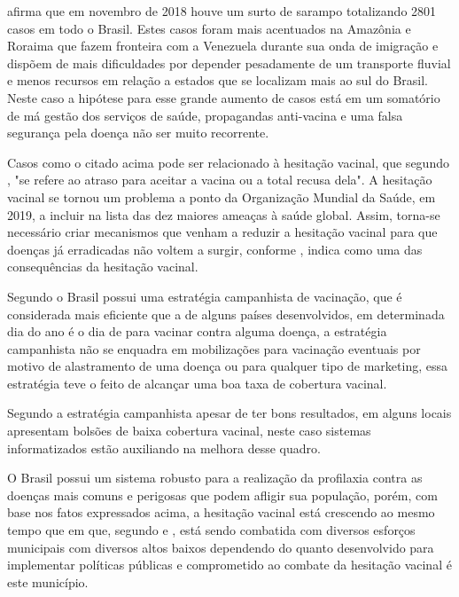 \cite{lima_os_2020} afirma que em novembro de 2018 houve um surto de sarampo totalizando 2801 casos em todo o Brasil. Estes casos foram mais acentuados na Amazônia e Roraima que fazem fronteira com a Venezuela durante sua onda de imigração e dispõem de mais dificuldades  por depender pesadamente de um transporte fluvial e menos recursos em relação a estados que se localizam mais ao sul do Brasil. Neste caso a hipótese para esse grande aumento de casos está em um somatório de má gestão dos serviços de saúde, propagandas anti-vacina e uma falsa segurança pela doença não ser muito recorrente.

Casos como o citado acima pode ser relacionado à hesitação vacinal, que segundo \cite{macdonald_vaccine_2015}, "se refere ao atraso para aceitar a vacina ou a total recusa dela". A hesitação vacinal se tornou um problema a ponto da Organização Mundial da Saúde, em 2019, a incluir na lista das dez maiores ameaças à saúde global. Assim, torna-se necessário criar mecanismos que venham a reduzir a hesitação vacinal para que doenças já erradicadas não voltem a surgir, conforme \cite{lima_os_2020}, indica como uma das consequências da hesitação vacinal.

Segundo \cite{temporao_o_2003} o Brasil possui uma estratégia campanhista de vacinação, que é considerada mais eficiente que a de alguns países desenvolvidos, em determinada dia do ano é o dia de para vacinar contra alguma doença, a estratégia campanhista não se enquadra em mobilizações para vacinação eventuais por motivo de alastramento de uma doença ou para qualquer tipo de marketing, essa estratégia teve o feito de alcançar uma boa taxa de cobertura vacinal.

Segundo \cite{sato_programa_2015} a estratégia campanhista apesar de ter bons resultados, em alguns locais apresentam bolsões de baixa cobertura vacinal, neste caso sistemas informatizados estão auxiliando na melhora desse quadro.

O Brasil possui um sistema robusto para a realização da profilaxia contra as doenças mais comuns e perigosas que podem afligir sua população, porém, com base nos fatos expressados acima, a hesitação vacinal está crescendo ao mesmo tempo que em que, segundo \cite{sato_programa_2015} e \cite{cardoso_implantacao_2017}, está sendo combatida com diversos esforços municipais com diversos altos baixos dependendo do quanto desenvolvido para implementar políticas públicas e comprometido ao combate da hesitação vacinal é este município. 


